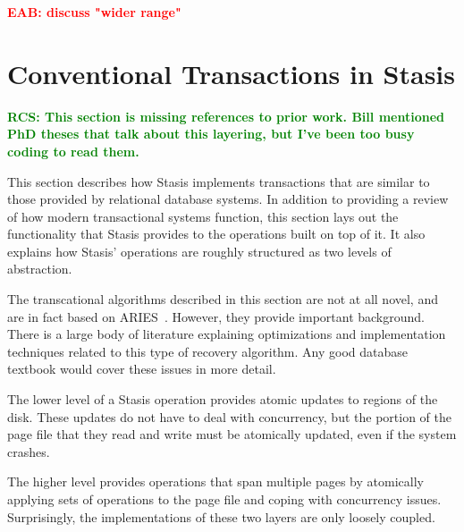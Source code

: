 \documentclass[letterpaper,twocolumn,10pt]{article}
\newcommand{\yad}{Stasis\xspace}
\newcommand{\yads}{Stasis'\xspace}
\newcommand{\eab}[1]{\textcolor{red}{\bf EAB: #1}}
\newcommand{\rcs}[1]{\textcolor{green}{\bf RCS: #1}}
\begin{document}
\eab{discuss "wider range"}




\section{Conventional Transactions in \yad}

\rcs{This section is missing references to prior work.  Bill mentioned
PhD theses that talk about this layering, but I've been too busy
coding to read them.}

This section describes how \yad implements transactions that are
similar to those provided by relational database systems.  In addition
to providing a review of how modern transactional systems function,
this section lays out the functionality that \yad provides to the
operations built on top of it.  It also explains how \yads
operations are roughly structured as two levels of abstraction.  

The transcational algorithms described in this section are not at all
novel, and are in fact based on ARIES~\cite{aries}.  However, they
provide important background.  There is a large body of literature
explaining optimizations and implementation techniques related to this
type of recovery algorithm.  Any good database textbook would cover these
issues in more detail.

The lower level of a \yad operation provides atomic
updates to regions of the disk.  These updates do not have to deal
with concurrency, but the portion of the page file that they read and
write must be atomically updated, even if the system crashes.

The higher level provides operations that span multiple pages by
atomically applying sets of operations to the page file and coping
with concurrency issues.  Surprisingly, the implementations of these
two layers are only loosely coupled.
\end{document}
